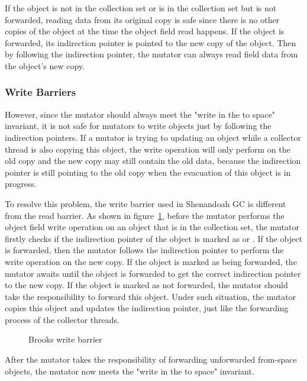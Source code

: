 If the object is not in the collection set or is in the collection set but is not forwarded,
reading data from its original copy is safe since there is no other copies of the object
at the time the object field read happens.
If the object is forwarded, its indirection pointer is pointed to the new copy of the object.
Then by following the indirection pointer, the mutator can always read field data from the object's new copy.

\subsubsection{Write Barriers}

However, since the mutator should always meet the "write in the to space" invariant,
it is not safe for mutators to write objects just by following the indirection pointers.
If a mutator is trying to updating an object while a collector thread is also copying
this object, the write operation will only perform on the old copy and the new copy may still contain the
old data, because the indirection pointer is still pointing to the old copy when
the evacuation of this object is in progress.

To resolve this problem, the write barrier used in Shenandoah GC is different from the
read barrier. As shown in figure~\ref{fig:brookswritebarrier}, before the mutator
performs the object field write operation on an object that is in the collection set,
the mutator firstly checks if the indirection pointer of the object is marked as 
or . If the object is forwarded, then the mutator follows
the indirection pointer to perform the write operation on the new copy.
If the object is marked as being forwarded, the mutator awaits until the object is forwarded to
get the correct indirection pointer to the new copy.
If the object is marked as not forwarded, the mutator should take the responsibility to forward this object.
Under such situation, the mutator copies this object and updates the indirection pointer,
just like the forwarding process of the collector threads.

\begin{figure}
  \centering
  
  \caption{Brooks write barrier}
  \label{fig:brookswritebarrier}
\end{figure}

After the mutator takes the responsibility of forwarding unforwarded from-space objects,
the mutator now meets the "write in the to space" invariant. 

